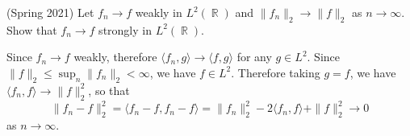 \documentclass[answers]{exam}
\DeclareMathOperator{\RR}{\mathbb{R}}
\begin{document}
\begin{questions}
\question (Spring 2021) Let $f_n \to f$ weakly in $L^2(\RR)$ and $ \| f_n \|_2 \to  \| f \|_2$ as $n\to\infty$. Show that $f_n\to f$ strongly in $L^2(\RR)$.

\begin{solution}
Since $f_n\to f$ weakly, therefore $\langle f_n, g \rangle \to \langle f, g \rangle$ for any $g\in L^2$. Since $\| f \|_2 \leq \sup_{n} \|f_n \|_2 <\infty$, we have $f\in L^2$. Therefore taking $g=f$, we have $\langle f_n,f\rangle \to \| f \|_2^2$, so that
\begin{equation*}
\| f_n-f \|_2^2 = \langle f_n-f,f_n-f\rangle = \| f_n \|_2^2 -2 \langle f_n,f\rangle + \| f \|^2_2 \to 0
\end{equation*}
as $n\to \infty$.
\end{solution}









\end{questions}
\end{document}
